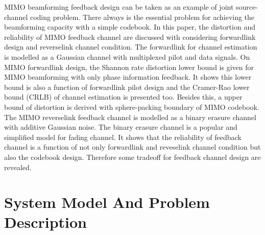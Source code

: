 \documentclass[10pt,fleqn, twocolumn]{IEEEtran}
\begin{document}
MIMO beamforming feedback design can be taken as an example of
joint source-channel coding problem. There always is the essential
problem for achieving the beamforming capacity with a simple
codebook. In this paper, the distortion and reliability of MIMO
feedback channel are discussed with considering forwardlink design
and reverselink channel condition. The forwardlink for channel
estimation is modelled as a Gaussian channel with multiplexed
pilot and data signals. On MIMO forwardlink design, the Shannon
rate distortion lower bound is given for MIMO beamforming with
only phase information feedback. It shows this lower bound is also
a function of forwardlink pilot design and the Cramer-Rao lower
bound (CRLB) of channel estimation is presented too. Besides this,
a upper bound of distortion is derived with sphere-packing
boundary of MIMO codebook. The MIMO reverselink feedback channel
is modelled as a binary erasure channel with additive Gaussian
noise. The binary erasure channel is a popular and simplified
model for fading channel. It shows that the reliability of
feedback channel is a function of not only forwardlink and
reveselink channel condition but also the codebook design.
Therefore some tradeoff for feedback channel design are revealed.

\section{System Model And Problem Description\label{MIMO_system_model}}
\end{document}
